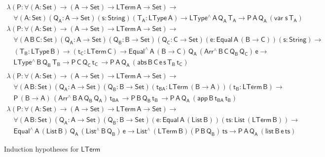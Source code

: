 \documentclass[sigplan,10pt,anonymous,review]{acmart}
\begin{document}
\begin{figure*}[t]

\begin{adjustbox}{varwidth=7.3in, max width=7.1in, margin=-0.0in 0in
      -0.2in 0in, fbox, center} 

{\small
\[\begin{array}{l}
\mathsf{\lambda (P : \forall (A : Set) \to (A \to Set) \to
  LTerm\,A  \to Set) \to}\\
  \quad\mathsf{\forall (A : Set) (Q_A : A \to Set) (s : String) (T_A :
  LType\, A) \to LType^{\wedge} \, A\, Q_A\, T_A \to P \, A\, Q_A\,
  (var \; s\, T_A)}\\[1ex]
  \mathsf{\lambda (P : \forall (A : Set) \to (A \to Set) \to
  LTerm\,A \to Set) \to} \\ 
  \quad\mathsf{
  \forall (A\,B\,C: Set) (Q_A : A \to Set)  (Q_B : B \to Set) (Q_C : C
  \to Set) (e : Equal\, A\, (B \to C)) (s : String) \to } \\ 
  \quad\mathsf{(T_B : LType\, B) \to (t_C : LTerm\, C)
  \to Equal^{\wedge}\,A\,(B \to C)\, Q_A \, (Arr^{\wedge} \, B\, C\,
  Q_B \, Q_C) \, e \to  } \\
  \quad\mathsf{
  LType^{\wedge}\, B\, Q_B\, T_B
  \to P\, C\, Q_C\, t_C\, 
  \to P \, A\, Q_A\, (abs \,B \,C \, e \,s \,T_B \, t_C)}\\
 \\
  \mathsf{\lambda (P : \forall (A : Set) \to (A \to Set) \to LTerm\,A
    \to Set)\to} \\ 
  \quad \mathsf{
  \forall (A \,B : Set) (Q_A : A \to Set)  (Q_B : B \to Set) 
   (t_{BA} : LTerm\, (B \to A)) (t_B : LTerm\, B) \to} \\
  \quad \mathsf{
  P\, (B \to A)\, (Arr^{\wedge} \, B\, A\, Q_B \, Q_A) \, t_{BA} \, 
  \to P\, B\, Q_B\, t_B\, 
  \to P \, A\, Q_A\, (app \,B \,t_{BA} \, t_B) }\\[1ex]
  \mathsf{\lambda (P : \forall (A : Set) \to (A \to Set) \to LTerm\,A
    \to Set) \to} \\ 
  \quad \mathsf{
  \forall (A \,B : Set) (Q_A : A \to Set)  (Q_B : B \to Set) 
    (e : Equal\, A\, (List\, B)) (ts : List\, (LTerm\, B)) \to} \\ 
  \quad \mathsf{
    Equal^{\wedge}\, A\, (List\,B)\, Q_A\, (List^{\wedge}\, B\, Q_B)\, e 
  \to List^{\wedge}\, (LTerm\,B) (P\, B\, Q_B)\, ts
  \to P \, A\, Q_A\, (list \,B \,e \, ts) }
\end{array}\]}

\vspace*{-0.1in}

\caption{Induction hypotheses for $\mathsf{LTerm}$}\label{fig:ind-hyps-lterm}
\end{adjustbox}
\end{figure*}
\end{document}
